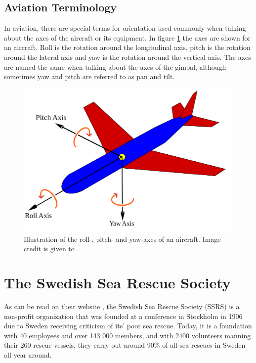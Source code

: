 \documentclass[nofilelist]{cslthse-msc}
\begin{document}
\subsection{Aviation Terminology}
In aviation, there are special terms for orientation used commonly when talking about the axes of the aircraft or its equipment. In figure \ref{fig:aircraft-axes} the axes are shown for an aircraft. Roll is the rotation around the longitudinal axis, pitch is the rotation around the lateral axis and yaw is the rotation around the vertical axis. The axes are named the same when talking about the axes of the gimbal, although sometimes yaw and pitch are referred to as pan and tilt.

\begin{figure}[!hbt]
   \centering
   \includegraphics[scale=0.25]{images/pitch-yaw-roll.png} 
   \caption{Illustration of the roll-, pitch- and yaw-axes of an aircraft. Image credit is given to \cite{aircraft-axes-pic}.}
   \label{fig:aircraft-axes}
\end{figure}

\section{The Swedish Sea Rescue Society}
As can be read on their website \cite{ssrs}, the Swedish Sea Rescue Society (SSRS) is a non-profit organization that was founded at a conference in Stockholm in 1906 due to Sweden receiving criticism of its' poor sea rescue. Today, it is a foundation with 40 employees and over 143 000 members, and with 2400 volunteers manning their 260 rescue vessels, they carry out around 90\% of all sea rescues in Sweden all year around.
\end{document}
